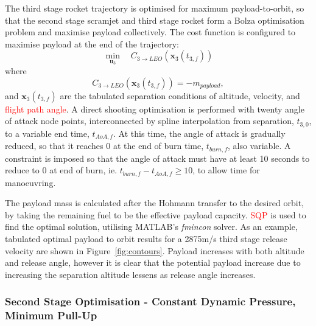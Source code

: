 \documentclass[journal]{new-aiaa}
\begin{document}
	  The third stage rocket trajectory is optimised for maximum payload-to-orbit, so that the second stage scramjet and third stage rocket form a Bolza optimisation problem and maximise payload collectively. The cost function is configured to maximise payload at the end of the trajectory:
	  \begin{equation} 
	  \min\limits_{\textbf{u}_3} \quad C_{3\rightarrow LEO}(\textbf{x}_{3}(t_{3,f})) 
	  \end{equation}
	  where
	  \begin{equation}
	  C_{3\rightarrow LEO}(\textbf{x}_{3}(t_{3,f})) = -m_{payload},
	  \end{equation}
	  and $\textbf{x}_{3}(t_{3,f})$ are the tabulated separation conditions of altitude, velocity, and \textcolor{red}{flight path angle}. A direct shooting optimisation is performed with twenty angle of attack node points, interconnected by spline interpolation from separation, $t_{3,0}$, to a variable end time, $t_{AoA,f}$. At this time, the angle of attack is gradually reduced, so that it reaches 0 at the end of burn time, $t_{burn,f}$, also variable.  A constraint is imposed so that the angle of attack must have at least 10 seconds to reduce to 0 at end of burn, ie. $t_{burn,f} - t_{AoA,f} \ge 10$, to allow time for manoeuvring.
	 
	  
	  
	  The payload mass is calculated after the Hohmann transfer to the desired orbit, by taking the remaining fuel to be the effective payload capacity. \textcolor{red}{SQP} is used to find the optimal solution, utilising MATLAB's \textit{fmincon} solver\cite{MATLAB}.
	    As an example, tabulated optimal payload to orbit results for a 2875m/s third stage release velocity are shown in Figure~\ref{fig:contours}. Payload increases with both altitude and release angle, however it is clear that the potential payload increase due to increasing the separation altitude lessens as release angle increases.  
	    
	
	 
	 	 \subsubsection{Second Stage Optimisation - Constant Dynamic Pressure, Minimum Pull-Up}
	 	 
\end{document}
